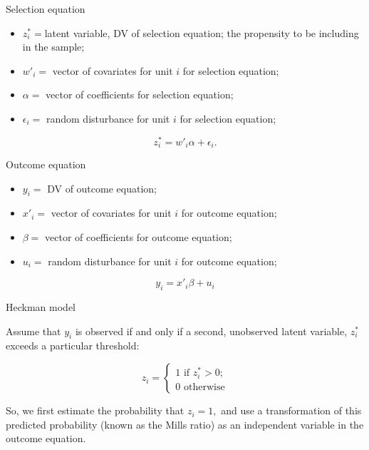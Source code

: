 \documentclass[10pt,ignorenonframetext,]{beamer}
\providecommand{\tightlist}{%
  \setlength{\itemsep}{0pt}\setlength{\parskip}{0pt}}
\begin{document}
\begin{frame}{Selection equation}

\begin{itemize}
\tightlist
\item
  \(z^*_i =\)latent variable, DV of selection equation; the propensity
  to be including in the sample;
\item
  \(w'_i =\) vector of covariates for unit \(i\) for selection equation;
\item
  \(\alpha =\) vector of coefficients for selection equation;
\item
  \(\epsilon_i =\) random disturbance for unit \(i\) for selection
  equation;
\end{itemize}

\[
z^*_i = w'_i \alpha + \epsilon_i.
\]

\Large Outcome equation

\normalsize

\begin{itemize}
\tightlist
\item
  \(y_i =\) DV of outcome equation;
\item
  \(x'_i =\) vector of covariates for unit \(i\) for outcome equation;
\item
  \(\beta =\) vector of coefficients for outcome equation;
\item
  \(u_i =\) random disturbance for unit \(i\) for outcome equation;
\end{itemize}

\[
y_i = x'_i \beta + u_i
\]

\end{frame}

\begin{frame}{Heckman model}

Assume that \(y_i\) is observed if and only if a second, unobserved
latent variable, \(z^*_i\) exceeds a particular threshold:

\[
z_i = \left\{ \begin{aligned}
  1 \text{ if } z^*_i > 0; \\
  0 \text{ otherwise}
\end{aligned}\right.
\]

So, we first estimate the probability that \(z_i = 1,\) and use a
transformation of this predicted probability (known as the Mills ratio)
as an independent variable in the outcome equation.

\end{frame}
\end{document}

